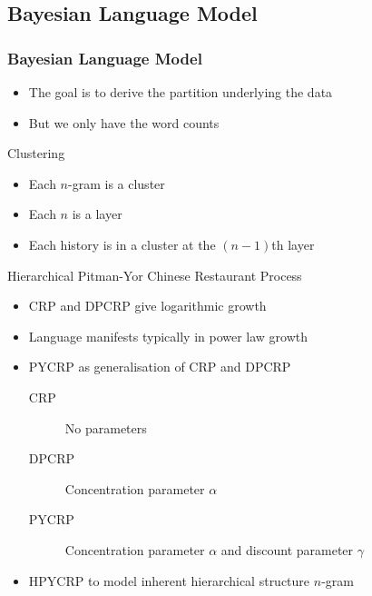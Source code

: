 \documentclass{beamer}
\begin{document}
\begin{frame}\section{Bayesian Language Model}
    \frametitle{Bayesian Language Model}

    \begin{itemize}
        \item The goal is to derive the partition underlying the data
        \item But we only have the word counts
    \end{itemize}

    \begin{block}{Clustering}
        \begin{itemize}
            \item Each $n$-gram is a cluster
            \item Each $n$ is a layer
            \item Each history is in a cluster at the $(n-1)$th layer
        \end{itemize}
    \end{block}

    \begin{block}{Hierarchical Pitman-Yor Chinese Restaurant Process}
        \begin{itemize}
            \item CRP and DPCRP give logarithmic growth
            \item Language manifests typically in power law growth
            \item PYCRP as generalisation of CRP and DPCRP
                \begin{description}
                    \item[CRP] No parameters
                    \item[DPCRP] Concentration parameter $\alpha$
                    \item[PYCRP] Concentration parameter $\alpha$ and discount parameter $\gamma$
                \end{description}
            \item HPYCRP to model inherent hierarchical structure $n$-gram
        \end{itemize}
    \end{block}
\end{frame}
\end{document}
